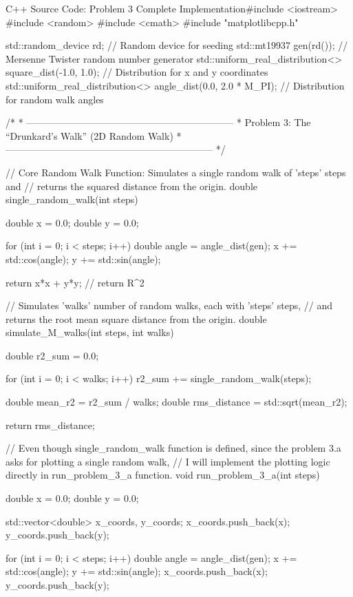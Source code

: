 \documentclass{article}
\begin{document}
\begin{codebox}{C++ Source Code: Problem 3 Complete Implementation}#include <iostream>
#include <random>
#include <cmath> 
#include "matplotlibcpp.h"

std::random_device rd; // Random device for seeding
std::mt19937 gen(rd()); // Mersenne Twister random number generator
std::uniform_real_distribution<> square_dist(-1.0, 1.0); // Distribution for x and y coordinates
std::uniform_real_distribution<> angle_dist(0.0, 2.0 * M_PI); // Distribution for random walk angles

/* 
 * -----------------------------------------------------------------
 * Problem 3: The “Drunkard’s Walk” (2D Random Walk)
 * -----------------------------------------------------------------
 */


// Core Random Walk Function: Simulates a single random walk of 'steps' steps and 
// returns the squared distance from the origin.
double single_random_walk(int steps) {

    double x = 0.0;
    double y = 0.0;

    for (int i = 0; i < steps; i++) {
        double angle = angle_dist(gen);
        x += std::cos(angle);
        y += std::sin(angle);
    }

    return x*x + y*y;  // return R^2
}

// Simulates 'walks' number of random walks, each with 'steps' steps,
// and returns the root mean square distance from the origin.
double simulate_M_walks(int steps, int walks) {

    double r2_sum = 0.0; 

    for (int i = 0; i < walks; i++) {
        r2_sum += single_random_walk(steps);
    }

    double mean_r2 = r2_sum / walks;
    double rms_distance = std::sqrt(mean_r2);

    return rms_distance;
}


// Even though single_random_walk function is defined, since the problem 3.a asks for plotting a single random walk,
// I will implement the plotting logic directly in run_problem_3_a function.
void run_problem_3_a(int steps) {
    double x = 0.0;
    double y = 0.0;
    
    std::vector<double> x_coords, y_coords;
    x_coords.push_back(x);
    y_coords.push_back(y);

    for (int i = 0; i < steps; i++) {
        double angle = angle_dist(gen);
        x += std::cos(angle);
        y += std::sin(angle);
        x_coords.push_back(x);
        y_coords.push_back(y);
    }
    
}
\end{codebox}
\end{document}
